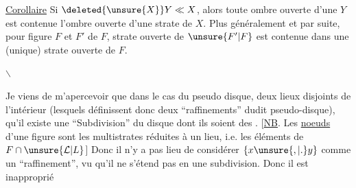 \uline{Corollaire} Si $\deleted{\unsure{X}}Y\ll X$, alors  toute ombre ouverte d'une   $Y$ est contenue  l'ombre ouverte d'une strate de $X$. Plus généralement et par suite, pour  figure $F$ et    $F'$ de $F$,    strate ouverte de $\unsure{F'|F}$ est contenue dans une (unique) strate ouverte de $F$.

\enspace$\backslash$

Je viens de m'apercevoir que dans le cas du pseudo disque,  deux lieux disjoints   de l'intérieur (lesquels définissent donc deux ``raffinements'' dudit pseudo-disque), qu'il existe une ``Subdivision'' du disque dont ils soient des . [\uline{NB}. Les \uline{noeuds} d'une figure  sont les multistrates  réduites à un lieu, i.e. les éléments de $F\cap\unsure{\mathcal L|L}$] Donc  il n'y a pas lieu de considérer $\{x\unsure{,|.}y\}$ comme un ``raffinement'', vu qu'il ne s'étend pas en une subdivision. Donc il est inapproprié
